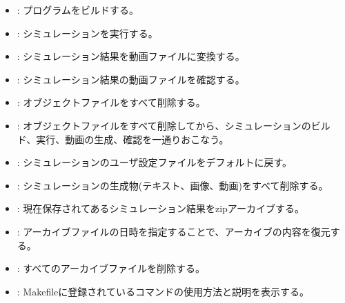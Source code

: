 \documentclass[vipdfmx,a4paper,11pt]{jsarticle}
\begin{document}
\begin{itemize}
  \item {} : プログラムをビルドする。
  \item {} : シミュレーションを実行する。
  \item {} : シミュレーション結果を動画ファイルに変換する。
  \item {} : シミュレーション結果の動画ファイルを確認する。
  \item {} : オブジェクトファイルをすべて削除する。
  \item {} : オブジェクトファイルをすべて削除してから、シミュレーションのビルド、実行、動画の生成、確認を一通りおこなう。
  \item {} : シミュレーションのユーザ設定ファイルをデフォルトに戻す。
  \item {} : シミュレーションの生成物(テキスト、画像、動画)をすべて削除する。
  \item {} : 現在保存されてあるシミュレーション結果をzipアーカイブする。
  \item {} : アーカイブファイルの日時を指定することで、アーカイブの内容を復元する。
  \item {} : すべてのアーカイブファイルを削除する。
  \item {} : Makefileに登録されているコマンドの使用方法と説明を表示する。
\end{itemize}
\end{document}
